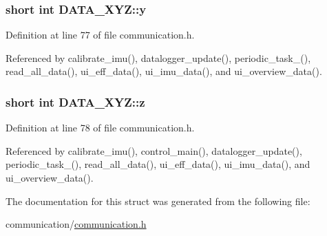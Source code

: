 \hypertarget{structDATA__XYZ_a94bbb1c889bf53eb6a5fffa2b39322cf}{
\subsubsection[{y}]{\setlength{\rightskip}{0pt plus 5cm}short int D\-A\-T\-A\-\_\-\-X\-Y\-Z\-::y}}\label{structDATA__XYZ_a94bbb1c889bf53eb6a5fffa2b39322cf}


Definition at line 77 of file communication.\-h.



Referenced by calibrate\-\_\-imu(), datalogger\-\_\-update(), periodic\-\_\-task\-\_(), read\-\_\-all\-\_\-data(), ui\-\_\-eff\-\_\-data(), ui\-\_\-imu\-\_\-data(), and ui\-\_\-overview\-\_\-data().

\hypertarget{structDATA__XYZ_a69e89ab0ec6e5d72fc5d54f62cc07fb5}{
\subsubsection[{z}]{\setlength{\rightskip}{0pt plus 5cm}short int D\-A\-T\-A\-\_\-\-X\-Y\-Z\-::z}}\label{structDATA__XYZ_a69e89ab0ec6e5d72fc5d54f62cc07fb5}


Definition at line 78 of file communication.\-h.



Referenced by calibrate\-\_\-imu(), control\-\_\-main(), datalogger\-\_\-update(), periodic\-\_\-task\-\_(), read\-\_\-all\-\_\-data(), ui\-\_\-eff\-\_\-data(), ui\-\_\-imu\-\_\-data(), and ui\-\_\-overview\-\_\-data().



The documentation for this struct was generated from the following file\-:\begin{DoxyCompactItemize}
\item 
communication/\hyperlink{communication_8h}{communication.\-h}\end{DoxyCompactItemize}

